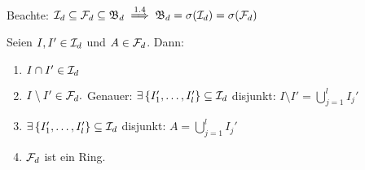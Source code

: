 \documentclass[a4paper,twoside,DIV15,BCOR12mm,chapterprefix=true,headings=onelinechapter]{scrbook}
\begin{document}
Beachte: \(\mathcal{I}_{d}\subseteq\mathcal{F}_{d}\subseteq\mathfrak{B}_{d}\overset{1.4}{\implies}\mathfrak{B}_{d}=\sigma(\mathcal{I}_{d})=\sigma(\mathcal{F}_{d})\)
\begin{lemma}
\label{Lemma 2.1}
Seien \(I,I'\in\mathcal{I}_{d}\) und \(A\in\mathcal{F}_{d}\). Dann:
\begin{enumerate}
\item \(I\cap I'\in\mathcal{I}_{d}\)
\item \(I\setminus I'\in\mathcal{F}_{d}.\) Genauer: \(\exists\left\{I_{1}',\ldots,I_{l}'\right\}\subseteq\mathcal{I}_{d}\) disjunkt:
\(I\setminus I'=\bigcup_{j=1}^{l}{I_{j}'}\) %
\item \(\exists\left\{I_{1}',\ldots,I_{l}'\right\}\subseteq\mathcal{I}_{d}\) disjunkt: \(A=\bigcup_{j=1}^{l}{I_{j}'}\)
\item \(\mathcal{F}_d\) ist ein Ring.
\end{enumerate}
\end{lemma}
\end{document}
